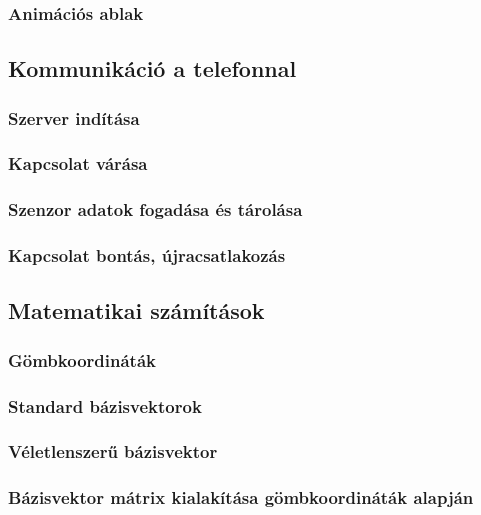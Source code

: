 \documentclass[
]{thesis-ekf}
\theoremstyle{definition}
\theoremstyle{remark}
\begin{document}
\subsubsection{Animációs ablak}

\subsection{Kommunikáció a telefonnal}

\subsubsection{Szerver indítása}

\subsubsection{Kapcsolat várása}

\subsubsection{Szenzor adatok fogadása és tárolása}

\subsubsection{Kapcsolat bontás, újracsatlakozás}

\subsection{Matematikai számítások}

\subsubsection{Gömbkoordináták}

\subsubsection{Standard bázisvektorok}

\subsubsection{Véletlenszerű bázisvektor}

\subsubsection{Bázisvektor mátrix kialakítása gömbkoordináták alapján}
\end{document}
